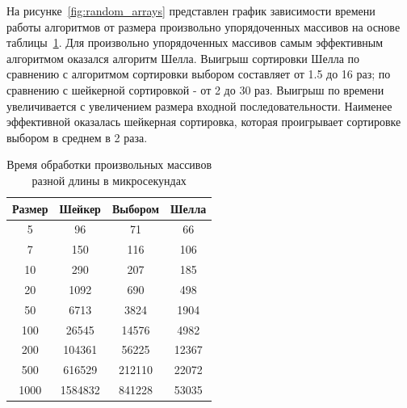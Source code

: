 \documentclass[12pt]{report}
\begin{document}
    На рисунке~\ref{fig:random_arrays} представлен график зависимости времени работы алгоритмов
    от размера произвольно упорядоченных массивов на основе таблицы~\ref{tab:rand_time}.
    Для произвольно упорядоченных массивов самым эффективным алгоритмом оказался алгоритм Шелла.
    Выигрыш сортировки Шелла по сравнению с алгоритмом сортировки выбором составляет от 1.5 до 16 раз;
    по сравнению с шейкерной сортировкой - от 2 до 30 раз.
    Выигрыш по времени увеличивается с увеличением размера входной последовательности.
    Наименее эффективной оказалась шейкерная сортировка, которая проигрывает сортировке выбором в среднем в 2 раза.
    \begin{table}[H]
        \begin{center}
            \captionsetup{justification=raggedleft, singlelinecheck=false}
            \caption{\label{tab:rand_time} Время обработки произвольных массивов разной длины в микросекундах}
            \begin{tabular}{|c c c c|}
                \hline
                Размер & Шейкер  & Выбором & Шелла\\ [0.5ex]
                \hline
                5      & 96      & 71      & 66    \\
                \hline
                7      & 150     & 116     & 106   \\
                \hline
                10     & 290     & 207     & 185   \\
                \hline
                20     & 1092    & 690     & 498   \\
                \hline
                50     & 6713    & 3824    & 1904  \\
                \hline
                100    & 26545   & 14576   & 4982  \\
                \hline
                200    & 104361  & 56225   & 12367 \\
                \hline
                500    & 616529  & 212110  & 22072 \\
                \hline
                1000   & 1584832 & 841228  & 53035 \\
                \hline
            \end{tabular}
        \end{center}
    \end{table}
\end{document}
